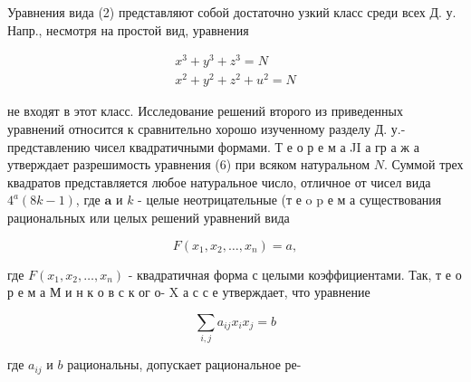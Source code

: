 \documentclass[10pt]{article}
\begin{document}
Уравнения вида (2) представляют собой достаточно узкий класс среди всех Д. у. Напр., несмотря на простой вид, уравнения



\[

\begin{gathered}

x^{3}+y^{3}+z^{3}=N \\

x^{2}+y^{2}+z^{2}+u^{2}=N

\end{gathered}

\]



не входят в этот класс. Исследование решений второго из приведенных уравнений относится к сравнительно хорошо изученному разделу Д. у.- представлению чисел квадратичными формами. Т е о р е м а JI а гр а ж а утверждает разрешимость уравнения (6) при всяком натуральном $N$. Суммой трех квадратов представляется любое натуральное число, отличное от чисел вида $4^{a}(8 k-1)$, где $\boldsymbol{a}$ и $k$ - целые неотрицательные (т е o p е м а существования рациональных или целых решений уравнений вида



\[

F\left(x_{1}, x_{2}, \ldots, x_{n}\right)=a,

\]



где $F\left(x_{1}, x_{2}, \ldots, x_{n}\right)$ - квадратичная форма с целыми коэффициентами. Так, т е о р е м а М и н к о в с к ог о- X а с с е утверждает, что уравнение



\[

\sum_{i, j} a_{i j} x_{i} x_{j}=b

\]



где $a_{i j}$ и $b$ рациональны, допускает рациональное ре-
\end{document}
